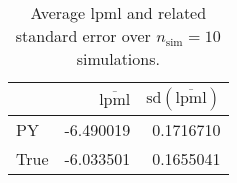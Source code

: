 \begin{table}[H]

\caption{Average lpml and related standard error over $n_{\text{sim}} = 10$ simulations.}
\centering
\begin{tabular}[t]{lrr}
\toprule
  & $\overbar{\text{lpml}}$ & $\text{sd}(\overbar{\text{lpml}})$\\
\midrule
PY & -6.490019 & 0.1716710\\
True & -6.033501 & 0.1655041\\
\bottomrule
\end{tabular}
\end{table}